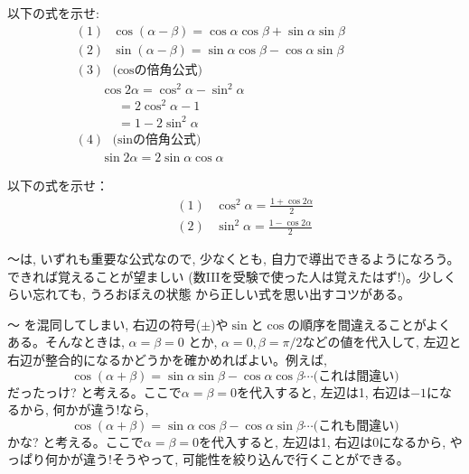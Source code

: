 \begin{q}\label{q:trig_kahouteiri2} 以下の式を示せ:
\begin{eqnarray}
&&(1)\,\,\,\,\cos(\alpha - \beta)=\cos\alpha \cos\beta + \sin\alpha \sin\beta\,\,\,\,\,\,\,\,\,\,\,\,\,\,\,\,\,\,\,\,\,\,\,\,\,\,\,\,\,\,\,\,\,\label{eq:add_sin3}\\
&&(2)\,\,\,\,\sin(\alpha - \beta)=\sin\alpha \cos\beta - \cos\alpha \sin\beta\,\,\,\,\,\,\,\,\,\,\,\,\,\,\,\,\,\label{eq:add_sin4}\\
&&(3)\,\,\,\,\text{(cosの倍角公式)}\nonumber\\
&&\,\,\,\,\,\,\,\,\,\,\,\,\cos 2\alpha = \cos^2 \alpha - \sin^2 \alpha \label{eq:cos2_1}\\
&&\,\,\,\,\,\,\,\,\,\,\,\,\,\,\,\,\,\,\,\,= 2\cos^2 \alpha - 1 \label{eq:cos2_2}\\
&&\,\,\,\,\,\,\,\,\,\,\,\,\,\,\,\,\,\,\,\,= 1 - 2\sin^2 \alpha \label{eq:cos2_3}\\
&&(4)\,\,\,\,\text{(sinの倍角公式)}\nonumber\\
&&\,\,\,\,\,\,\,\,\,\,\,\,\sin 2 \alpha = 2 \sin \alpha \cos \alpha\label{eq:sin2a}
\end{eqnarray}
\end{q}

\begin{q}\label{q:trig_sincos5} 以下の式を示せ：
\begin{eqnarray}
&&(1)\,\,\,\,\,\cos^2 \alpha = \frac{1+\cos 2\alpha}{2}\label{eq:cos_pow2}\\
&&(2)\,\,\,\,\,\sin^2 \alpha = \frac{1-\cos 2\alpha}{2}\label{eq:sin_pow2}
\end{eqnarray}
\end{q}
\mv

〜は, いずれも重要な公式なので, 
少なくとも, 自力で導出できるようになろう。できれば覚えることが望ましい
(数IIIを受験で使った人は覚えたはず!)。少しくらい忘れても, うろおぼえの状態
から正しい式を思い出すコツがある。\mv

\begin{exmpl}
〜
を混同してしまい, 右辺の符号($\pm$)や$\sin$と$\cos$の順序を間違えることがよくある。そんなときは, $\alpha=\beta=0$
とか, $\alpha=0, \beta=\pi/2$などの値を代入して, 左辺と右辺が整合的になるかどうかを確かめればよい。例えば, 
\[\cos(\alpha + \beta)=\sin\alpha \sin\beta - \cos\alpha \cos\beta \cdots\text{(これは間違い)}\]
だったっけ? と考える。ここで$\alpha=\beta=0$を代入すると, 左辺は1, 右辺は$-1$になるから, 何かが違う!なら, 
\[\cos(\alpha + \beta)=\sin\alpha \cos\beta - \cos\alpha \sin\beta \cdots\text{(これも間違い)}\]
かな? と考える。ここで$\alpha=\beta=0$を代入すると, 左辺は1, 右辺は$0$になるから, やっぱり何かが違う!そうやって, 
可能性を絞り込んで行くことができる。
\end{exmpl}\mv

